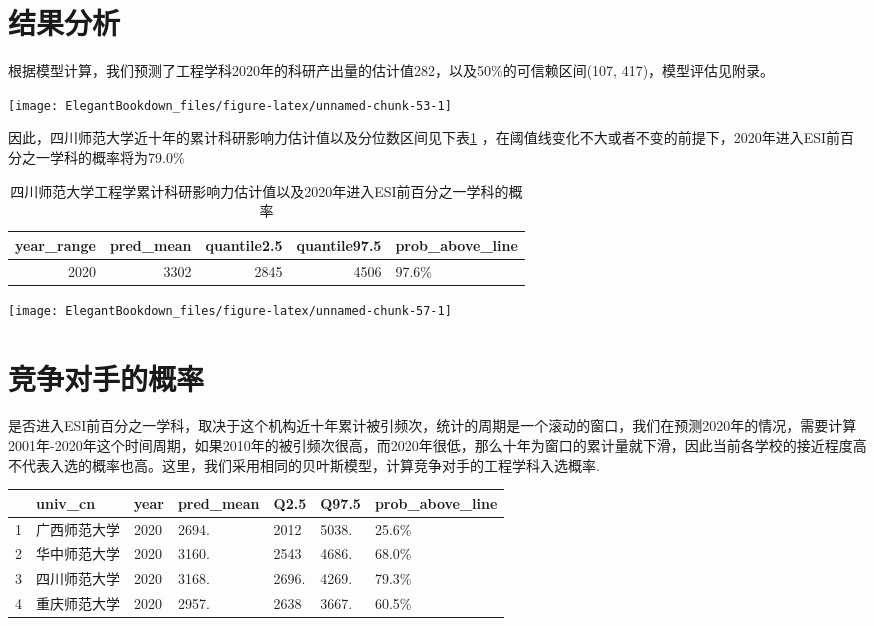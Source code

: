\documentclass[cn, 11pt, fancy, hide]{elegantbook}
\begin{document}
\hypertarget{ux7ed3ux679cux5206ux6790}{%
\section{结果分析}\label{ux7ed3ux679cux5206ux6790}}

根据模型计算，我们预测了工程学科2020年的科研产出量的估计值282，以及50\%的可信赖区间(107, 417)，模型评估见附录。

\begin{center}\texttt{[image: ElegantBookdown\_files/figure-latex/unnamed-chunk-53-1]} \end{center}

因此，四川师范大学近十年的累计科研影响力估计值以及分位数区间见下表\ref{tab:tabestimate} ，在阈值线变化不大或者不变的前提下，2020年进入ESI前百分之一学科的概率将为79.0\%

\begin{table}[!h]

\caption{\label{tab:tabestimate}四川师范大学工程学累计科研影响力估计值以及2020年进入ESI前百分之一学科的概率}
\centering
\begin{tabular}[t]{rrrrl}
\toprule
year\_range & pred\_mean & quantile2.5 & quantile97.5 & prob\_above\_line\\
\midrule
2020 & 3302 & 2845 & 4506 & 97.6\%\\
\bottomrule
\end{tabular}
\end{table}

\begin{center}\texttt{[image: ElegantBookdown\_files/figure-latex/unnamed-chunk-57-1]} \end{center}

\hypertarget{ux7adeux4e89ux5bf9ux624bux7684ux6982ux7387}{%
\section{竞争对手的概率}\label{ux7adeux4e89ux5bf9ux624bux7684ux6982ux7387}}

是否进入ESI前百分之一学科，取决于这个机构近十年累计被引频次，统计的周期是一个滚动的窗口，我们在预测2020年的情况，需要计算2001年-2020年这个时间周期，如果2010年的被引频次很高，而2020年很低，那么十年为窗口的累计量就下滑，因此当前各学校的接近程度高不代表入选的概率也高。这里，我们采用相同的贝叶斯模型，计算竞争对手的工程学科入选概率.

\begin{longtable}[]{@{}lllllll@{}}
\toprule
& univ\_cn & year & pred\_mean & Q2.5 & Q97.5 & prob\_above\_line\tabularnewline
\midrule
\endhead
1 & 广西师范大学 & 2020 & 2694. & 2012 & 5038. & 25.6\%\tabularnewline
2 & 华中师范大学 & 2020 & 3160. & 2543 & 4686. & 68.0\%\tabularnewline
3 & 四川师范大学 & 2020 & 3168. & 2696. & 4269. & 79.3\%\tabularnewline
4 & 重庆师范大学 & 2020 & 2957. & 2638 & 3667. & 60.5\%\tabularnewline
\bottomrule
\end{longtable}
\end{document}
